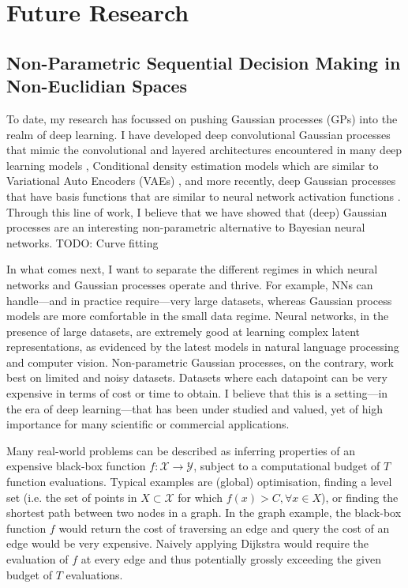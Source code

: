 \chapter{Future Research}
\label{chapter:future-research}

\section{Non-Parametric Sequential Decision Making in Non-Euclidian Spaces}

To date, my research has focussed on pushing Gaussian processes (GPs) into the realm of deep learning. I have developed deep convolutional Gaussian processes that mimic the convolutional and layered architectures encountered in many deep learning models \citep{Dutordoir2020convolutional}, Conditional density estimation models which are similar to Variational Auto Encoders (VAEs) \citep{dutordoir2018cde}, and more recently, deep Gaussian processes that have basis functions that are similar to neural network activation functions \citep{dutordoir2021deep}. Through this line of work, I believe that we have showed that (deep) Gaussian processes are an interesting non-parametric alternative to Bayesian neural networks. TODO: Curve fitting

In what comes next, I want to separate the different regimes in which neural networks and Gaussian processes operate and thrive. For example, NNs can handle---and in practice require---very large datasets, whereas Gaussian process models are more comfortable in the small data regime. Neural networks, in the presence of large datasets, are extremely good at learning complex latent representations, as evidenced by the latest models in natural language processing and computer vision. Non-parametric Gaussian processes, on the contrary, work best on limited and noisy datasets. Datasets where each datapoint can be very expensive in terms of cost or time to obtain. I believe that this is a setting---in the era of deep learning---that has been under studied and valued, yet of high importance for many scientific or commercial applications.

Many real-world problems can be described as inferring properties of an expensive black-box function $f: \mathcal{X} \rightarrow \mathcal{Y}$, subject to a computational budget of $T$ function evaluations. Typical examples are (global) optimisation, finding a level set (i.e. the set of points in $X \subset \mathcal{X}$ for which $f(x) > C,\forall x \in X$), or finding the shortest path between two nodes in a graph. In the graph example, the black-box function $f$ would return the cost of traversing an edge and query the cost of an edge would be very expensive. Naively applying Dijkstra would require the evaluation of $f$ at every edge and thus potentially grossly exceeding the given budget of $T$ evaluations.


